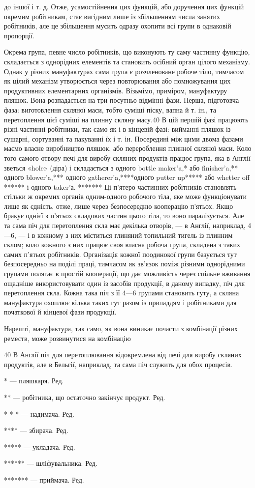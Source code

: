 до іншої і т. д. Отже, усамостійнення цих функцій, або доручення
цих функцій окремим робітникам, стає вигідним лише із збільшенням
числа занятих робітників, але це збільшення мусить
одразу охопити всі групи в однаковій пропорції.

Окрема група, певне число робітників, що виконують ту саму
частинну функцію, складається з однорідних елементів та становить
осібний орган цілого механізму. Однак у різних мануфактурах
сама група є розчленоване робоче тіло, тимчасом як цілий
механізм утворюється через повторювання або помножування
цих продуктивних елементарних організмів. Візьмімо, приміром,
мануфактуру пляшок. Вона розпадається на три посутньо відмінні
фази. Перша, підготовча фаза: виготовлення скляної маси,
тобто суміші піску, вапна й т. ін., та перетоплення цієї суміші
на плинну скляну масу.40 В цій першій фазі працюють різні
частинні робітники, так само як і в кінцевій фазі: вийманні
пляшок із сушарні, сортуванні та пакуванні їх і т. ін. Посередині
між цими двома фазами маємо власне виробництво пляшок, або
перероблення плинної скляної маси. Коло того самого отвору
печі для виробу скляних продуктів працює група, яка в Англії
зветься «hole» (діра) і складається з одного bottle maker’a,*
або finisher’a,** одного blower’a,*** одного gatherer’a,****одного
putter up***** або whetter off ****** і одного taker’а. *******
Ці п’ятеро частинних робітників становлять стільки ж окремих
органів одним-одного робочого тіла, яке може функціонувати лише
як єдність, отже, лише через безпосередню кооперацію п’ятьох.
Якщо бракує однієї з п’ятьох складових частин цього тіла, то
воно паралізується. Але та сама піч для перетоплення скла має декілька
отворів, — в Англії, наприклад, 4—6, — і в кожному з них
міститься глиняний топильний тигель із плинним склом; коло кожного
з них працює своя власна робоча група, складена з таких самих
п’ятьох робітників. Організація кожної поодинокої групи базується
тут безпосередньо на поділі праці, тимчасом як зв’язок поміж
різними однорідними групами полягає в простій кооперації,
що дає можливість через спільне вживання ощадніше використовувати
один із засобів продукції, в даному випадку, піч для перетоплення
скла. Кожна така піч з її 4—6 групами становить гуту,
а скляна мануфактура охоплює кілька таких гут разом із приладдям
і робітниками для початкової й кінцевої фази продукції.

Нарешті, мануфактура, так само, як вона виникає почасти
з комбінації різних реместв, може розвинутися на комбінацію

40    В Англії піч для перетоплювання відокремлена від печі для виробу
скляних продуктів, але в Бельгії, наприклад, та сама піч служить
для обох процесів.

* — пляшкаря. Ред.

** — робітника, що остаточно закінчує продукт. Ред.

* * * — надимача. Ред.

**** — збирача. Ред.

***** — укладача. Ред.

****** — шліфувальника. Ред.

******* — приймача. Ред.
